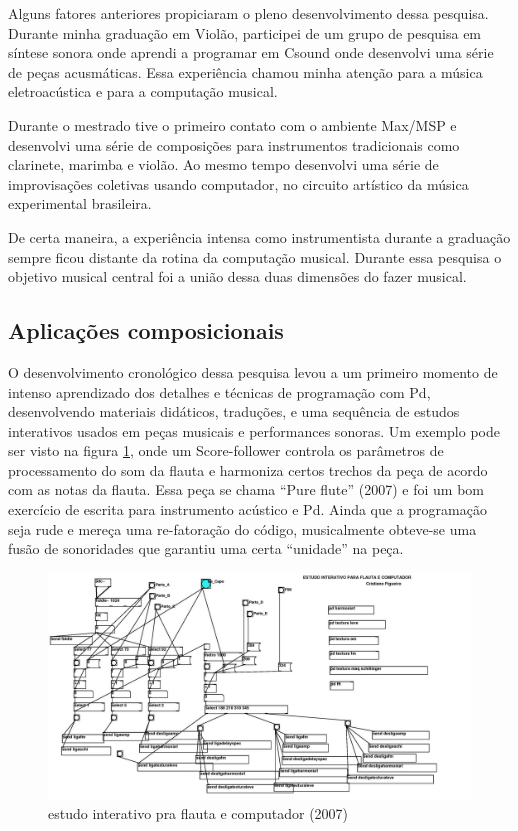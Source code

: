 \documentclass{ppgmus}
\begin{document}
Alguns fatores anteriores propiciaram o pleno desenvolvimento
dessa pesquisa. Durante minha graduação em Violão, participei
de um grupo de pesquisa em síntese sonora onde aprendi a programar
em Csound onde desenvolvi uma série de peças acusmáticas. 
Essa experiência chamou minha atenção para a música
eletroacústica e para a computação musical. 

Durante o mestrado tive o primeiro contato com o ambiente
Max/MSP e desenvolvi uma série de composições para instrumentos
tradicionais como clarinete, marimba e violão. Ao mesmo tempo
desenvolvi uma série de improvisações coletivas usando computador,
no circuito artístico da música experimental brasileira.

De certa maneira, a experiência intensa como instrumentista
durante a graduação sempre ficou distante da rotina da
computação musical. Durante essa pesquisa o objetivo musical central 
foi a união dessa duas dimensões do fazer musical.


\subsection{Aplicações composicionais}


O desenvolvimento cronológico dessa pesquisa levou a um primeiro momento de intenso aprendizado
dos detalhes e técnicas de programação com Pd, desenvolvendo materiais didáticos, traduções, e uma
sequência de estudos interativos usados em peças musicais e performances sonoras. Um exemplo pode ser visto
na figura \ref{flauta2007}, onde um Score-follower controla os parâmetros de 
processamento do som da flauta e harmoniza certos trechos da peça de acordo com as notas da flauta.
Essa peça se chama ``Pure flute'' (2007) e foi um bom exercício de escrita para instrumento acústico
e Pd. Ainda que a programação seja rude e mereça uma re-fatoração do código, musicalmente 
obteve-se uma fusão de sonoridades que garantiu uma certa ``unidade'' na peça.

\begin{figure}
\includegraphics[scale=.3]{flauta2007}
\caption{estudo interativo pra flauta e computador (2007)}
\label{flauta2007}
\end{figure} 
\end{document}
